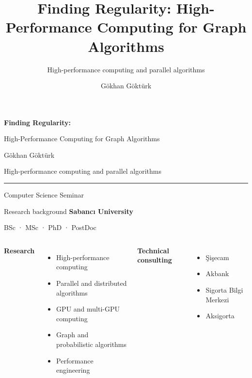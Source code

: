 \documentclass[10pt,aspectratio=169]{beamer}
\title{Finding Regularity: High-Performance Computing for Graph Algorithms}
\subtitle{High-performance computing and parallel algorithms}
\author{Gökhan Göktürk}
\institute{Computer Science}
\date{}
\begin{document}
\begin{frame}[plain]{}
\relax
{\Large\bfseries\color{DeepNavy}Finding Regularity:\par
High-Performance Computing for Graph Algorithms\par}
\par\vspace{0.7cm}
{\large Gökhan Göktürk\par}
\par\vspace{0.2cm}
High-performance computing and parallel algorithms\par
\par\vspace{0.6cm}
{\color{Teal}\rule{\linewidth}{0.8pt}}\par
Computer Science Seminar
\end{frame}


\begin{frame}{Research background}
\relax
\textbf{Sabancı University}\par
BSc · MSc · PhD · PostDoc
\par\vspace{0.5cm}
\begin{columns}[T,onlytextwidth]
\textbf{Research}
\begin{itemize}
  \item High-performance computing
  \item Parallel and distributed algorithms
  \item GPU and multi-GPU computing
  \item Graph and probabilistic algorithms
  \item Performance engineering
\end{itemize}
\textbf{Technical consulting}
\begin{itemize}
  \item Şişecam
  \item Akbank
  \item Sigorta Bilgi Merkezi
  \item Aksigorta
\end{itemize}
\end{columns}
\end{frame}
\end{document}
